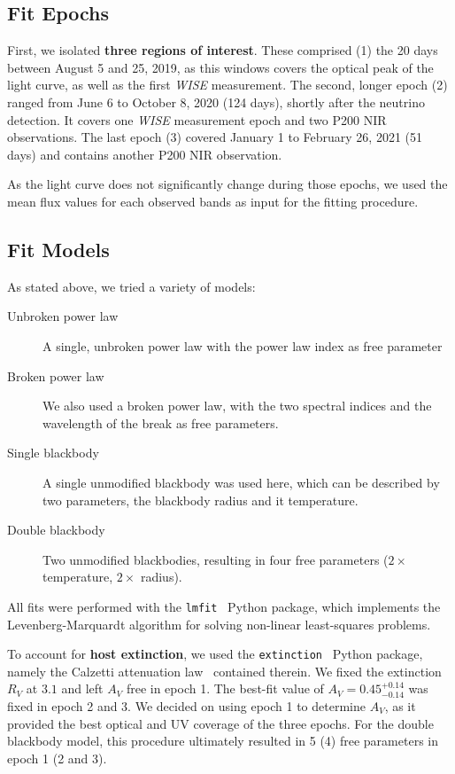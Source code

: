 \subsection{Fit Epochs}
First, we isolated \textbf{three regions of interest}. These comprised (1) the 20 days between August 5 and 25, 2019, as this windows covers the optical peak of the light curve, as well as the first \textit{WISE} measurement. The second, longer epoch (2) ranged from June 6 to October 8, 2020 (124 days), shortly after the neutrino detection. It covers one \textit{WISE} measurement epoch and two P200 NIR observations. The last epoch (3) covered January 1 to February 26, 2021 (51 days) and contains another P200 NIR observation.

As the light curve does not significantly change during those epochs, we used the mean flux values for each observed bands as input for the fitting procedure.

\subsection{Fit Models}\label{fitmodels}
As stated above, we tried a variety of models:

\begin{description}
    \item[Unbroken power law] A single, unbroken power law with the power law index as free parameter
    \item[Broken power law] We also used a broken power law, with the two spectral indices and the wavelength of the break as free parameters.
    \item[Single blackbody] A single unmodified blackbody was used here, which can be described by two parameters, the blackbody radius and it temperature.
    \item[Double blackbody] Two unmodified blackbodies, resulting in four free parameters ($2 \times$ temperature, $2 \times$ radius).
\end{description}

All fits were performed with the \texttt{lmfit}~ Python package, which implements the Levenberg-Marquardt algorithm for solving non-linear least-squares problems.

To account for \textbf{host extinction}, we used the \texttt{extinction}~ Python package, namely the Calzetti attenuation law~ contained therein. We fixed the extinction $R_V$ at $3.1$ and left $A_V$ free in epoch 1. The best-fit value of $A_V=0.45^{+0.14}_{-0.14}$ was fixed in epoch 2 and 3. We decided on using epoch 1 to determine $A_V$, as it provided the best optical and UV coverage of the three epochs. For the double blackbody model, this procedure ultimately resulted in 5 (4) free parameters in epoch 1 (2 and 3).


